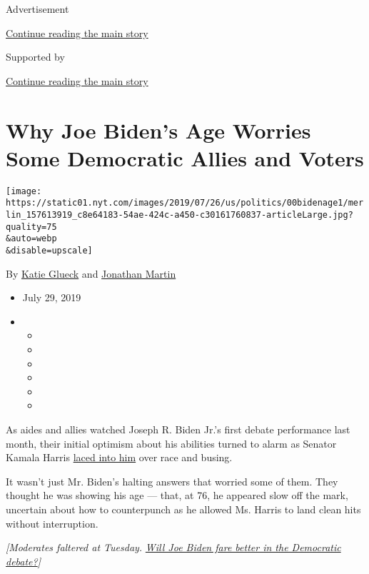 Advertisement

\protect\hyperlink{after-top}{Continue reading the main story}

Supported by

\protect\hyperlink{after-sponsor}{Continue reading the main story}

\hypertarget{why-joe-bidens-age-worries-some-democratic-allies-and-voters}{%
\section{Why Joe Biden's Age Worries Some Democratic Allies and
Voters}\label{why-joe-bidens-age-worries-some-democratic-allies-and-voters}}

\texttt{[image: https://static01.nyt.com/images/2019/07/26/us/politics/00bidenage1/merlin\_157613919\_c8e64183-54ae-424c-a450-c30161760837-articleLarge.jpg?quality=75\\\&auto=webp\\\&disable=upscale]}

By \href{https://www.nytimes.com/by/katie-glueck}{Katie Glueck} and
\href{https://www.nytimes.com/by/jonathan-martin}{Jonathan Martin}

\begin{itemize}
\item
  July 29, 2019
\item
  \begin{itemize}
  \item
  \item
  \item
  \item
  \item
  \item
  \end{itemize}
\end{itemize}

As aides and allies watched Joseph R. Biden Jr.'s first debate
performance last month, their initial optimism about his abilities
turned to alarm as Senator Kamala Harris
\href{https://www.nytimes.com/2019/06/27/us/politics/kamala-harris-joe-biden-busing.html}{laced
into him} over race and busing.

It wasn't just Mr. Biden's halting answers that worried some of them.
They thought he was showing his age --- that, at 76, he appeared slow
off the mark, uncertain about how to counterpunch as he allowed Ms.
Harris to land clean hits without interruption.

\emph{{[}Moderates faltered at Tuesday.}
\href{https://www.nytimes.com/2019/07/31/us/politics/debate-moderate-progressive-democrats.html}{\emph{Will
Joe Biden fare better in the Democratic debate?}}\emph{{]}}


